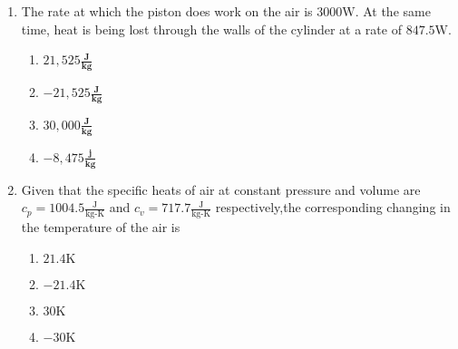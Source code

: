 \documentclass[journal]{IEEEtran}
\begin{document}
\begin{enumerate}[start=49]
\begin{multicols}{4}
\begin{enumerate}
        \item $1:1$        
    \end{enumerate}
\end{multicols}    
\bigskip
$\textbf{Statement for Linked Answer Question 59 and 60:}$\\
A piston compresses 1 kg of air inside a cylinder as shown. 
\begin{figure}[H]
\centering
{}%

\label{fig:my_label}
\end{figure}
\item The rate at which the piston does work on the air is $3000\text{W}.$ At the same time, heat is being lost through the walls of the cylinder at a rate of $847.5\text{W}.$
\begin{multicols}{4}
    \begin{enumerate}
        \item $21,525\frac{\textbf{J}}{\textbf{kg}}$
        \item $-21,525\frac{\textbf{J}}{\textbf{kg}}$
        \item $30,000\frac{\textbf{J}}{\textbf{kg}}$
        \item $-8,475\frac{\textbf{j}}{\textbf{kg}}$        
    \end{enumerate}
\end{multicols}
\bigskip
\item Given that the specific heats of air at constant pressure and volume are $c_{p}=1004.5\frac{\text{J}}{\text{kg-K}}$ and $c_{v}=717.7\frac{\text{J}}{\text{kg-K}}$ respectively,the corresponding  changing in the temperature of the air is 
\begin{multicols}{4}
    \begin{enumerate}
        \item $21.4\text{K}$
        \item $-21.4\text{K}$
        \item $30\text{K}$
        \item $-30\text{K}$        
    \end{enumerate}
\end{multicols}




\end{enumerate}
\end{document}
